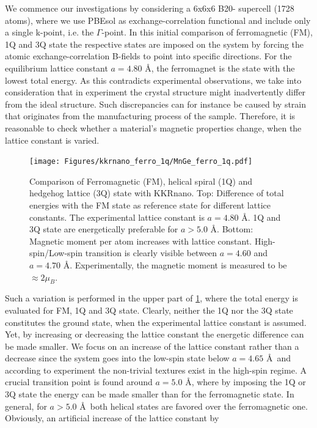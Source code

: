 \documentclass[graybox]{svmult}
\begin{document}
We commence our investigations by considering a 6x6x6 B20- supercell (1728 atoms), where we use PBEsol 
as exchange-correlation functional
and include only a single k-point, i.e. the $\Gamma$-point.
In this initial comparison of ferromagnetic (FM), 1Q and 3Q state the respective states are imposed on
the system by forcing the atomic exchange-correlation B-fields
to point into specific directions. 
For the equilibrium lattice constant
$a=4.80$ \AA, the ferromagnet is the state with the lowest total energy.
As this contradicts experimental observations, we take into consideration that
in experiment the crystal structure might inadvertently differ from the ideal structure.
Such discrepancies can for instance be caused by strain that 
originates from the manufacturing process of the sample.
Therefore, it is reasonable to check whether a material's magnetic properties change, when the
lattice constant is varied.
\begin{figure}[htb]
  \centering
   \texttt{[image: Figures/kkrnano\_ferro\_1q/MnGe\_ferro\_1q.pdf]}
	\caption{Comparison of Ferromagnetic (FM), helical spiral (1Q) and hedgehog lattice (3Q) 
	state with KKRnano.
	Top: Difference of total energies with the FM state as reference state for different
	lattice constants. The experimental lattice constant is $a=4.80$ \AA. 1Q and 3Q state
	are energetically preferable for $a > 5.0$ \AA.
	Bottom: Magnetic moment per  atom increases with lattice constant.
	High-spin/Low-spin transition is clearly visible between $a=4.60$ and $a=4.70$ \AA.
	Experimentally, the magnetic moment is measured to be $\approx 2 \mu_B$.}
\label{fig:MnGe_kkrnano_comparison}
\end{figure}
Such a variation is performed in the upper part of \cref{fig:MnGe_kkrnano_comparison}, where
the total energy is evaluated for FM, 1Q and 3Q state.
Clearly, neither the 1Q nor the 3Q state constitutes the ground state,
when the experimental lattice constant is assumed.
Yet, by increasing or decreasing the lattice constant the energetic difference can be made
smaller.
We focus on an increase of the lattice constant rather than a decrease since 
the system goes into the low-spin state below $a=4.65$ \AA \, \cite{rosler_ab_2012} and according to experiment
the non-trivial textures
exist in the high-spin regime.
A crucial transition point is found around $a=5.0$ \AA,
where by imposing the 1Q or 3Q state the energy can be made smaller than for the ferromagnetic state.
In general, for $a>5.0$ \AA \, both helical states are favored over the ferromagnetic one.
Obviously, an artificial increase of the lattice constant by
\end{document}
